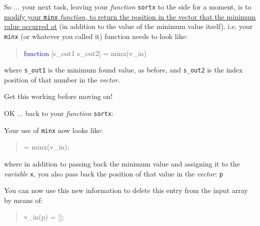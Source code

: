\documentclass{tufte-book} %
\newenvironment{docspec}{\begin{quotation}\ttfamily\parskip0pt\parindent0pt\ignorespaces}{\end{quotation}}
\begin{document}
So ... your next task, leaving your \textit{function} \texttt{sortx} to the side for a moment, is to \uline{modify your \texttt{minx} \textit{function}, to return the position in the vector that the minimum value occurred at} (in addition to the value of the minimum value itself). i.e. your \texttt{minx} (or whatever you called it) function needs to look like:
\vspace{-1mm}
\begin{docspec}
\textcolor{blue}{function} [s\_out1 s\_out2] = minx(v\_in)
\end{docspec}
\vspace{-1mm}
where \texttt{s\_out1} is the minimum found value, as before, and \texttt{s\_out2} is the index position of that number in the \textit{vector}.

Get this working before moving on!

\vspace{1mm}
\noindent OK ... back to your \textit{function} \texttt{sortx}:

Your use of \texttt{minx} now looks like:
\vspace{-1mm}
\begin{docspec}
[x p] = minx(v\_in);
\end{docspec}
\vspace{-1mm}
where in addition to passing back the minimum value and assigning it to the \textit{variable} \texttt{x}, you also pass back the position of that value in the \textit{vector}: \texttt{p}

You can now use this new information to delete this entry from the input array by means of:
\vspace{-1mm}
\begin{docspec}
v\_in(p) = [];
\end{docspec}
\vspace{-1mm}
\end{document}
